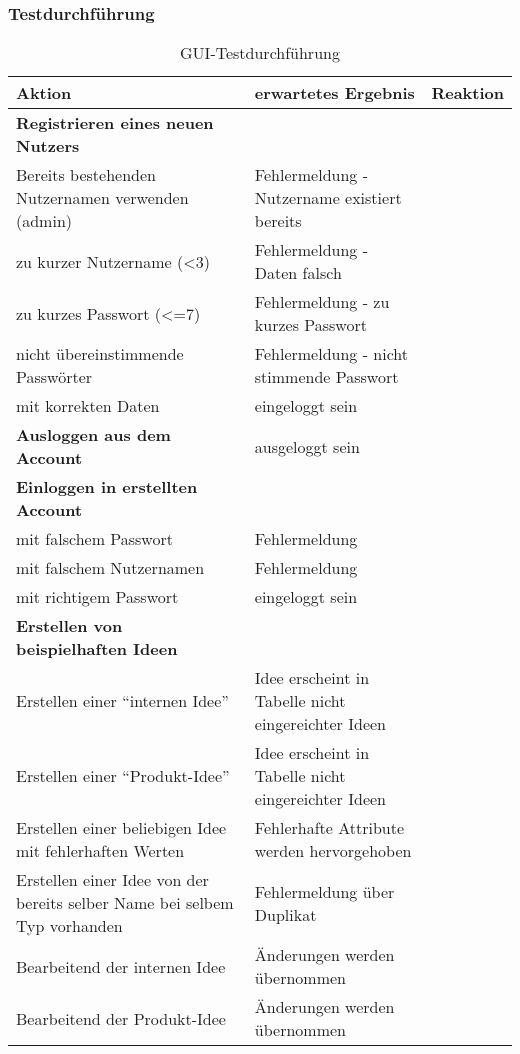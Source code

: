 \subsubsection*{Testdurchführung}

\begin{center}
\begin{longtable}{|p{}|p{}|p{}|}
\caption{GUI-Testdurchführung}\\
\hline
Aktion & erwartetes Ergebnis & Reaktion\\
\hline
\hline

\textbf{Registrieren eines neuen Nutzers} & &\\
\hline
Bereits bestehenden Nutzernamen verwenden (admin) & Fehlermeldung - Nutzername existiert bereits &\\
\hline
zu kurzer Nutzername (<3) & Fehlermeldung - Daten falsch &\\
\hline
zu kurzes Passwort (<=7) & Fehlermeldung - zu kurzes Passwort &\\
\hline
nicht übereinstimmende Passwörter & Fehlermeldung - nicht stimmende Passwort &\\
\hline
mit korrekten Daten & eingeloggt sein &\\
\hline
\hline

\textbf{Ausloggen aus dem Account} & ausgeloggt sein &\\
\hline
\hline

\textbf{Einloggen in erstellten Account} & &\\
\hline
mit falschem Passwort & Fehlermeldung &\\
\hline
mit falschem Nutzernamen & Fehlermeldung &\\
\hline
mit richtigem Passwort & eingeloggt sein &\\
\hline
\hline

\textbf{Erstellen von beispielhaften Ideen} & &\\
\hline
Erstellen einer \enquote{internen Idee} & Idee erscheint in Tabelle nicht eingereichter Ideen &\\
\hline
Erstellen einer \enquote{Produkt-Idee} & Idee erscheint in Tabelle nicht eingereichter Ideen &\\
\hline
Erstellen einer beliebigen Idee mit fehlerhaften Werten & Fehlerhafte Attribute werden hervorgehoben &\\
\hline
Erstellen einer Idee von der bereits selber Name bei selbem Typ vorhanden & Fehlermeldung über Duplikat &\\
\hline
Bearbeitend der internen Idee & Änderungen werden übernommen &\\
\hline
Bearbeitend der Produkt-Idee & Änderungen werden übernommen &\\
\hline
\hline


\end{longtable}
\end{center}
